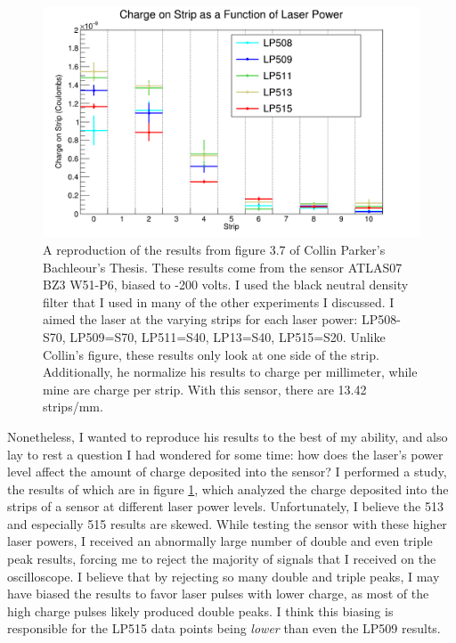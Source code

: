 \documentclass{report}
\begin{document}
            \begin{figure}[h] 
                \includegraphics[height=.4\textheight]{charge_collection}
                \centering
                \caption{ A reproduction of the results from figure 3.7 of Collin Parker's Bachleour's Thesis. These results come from the sensor ATLAS07 BZ3 W51-P6, biased to -200 volts. I used the black neutral density filter that I used in many of the other experiments I discussed. I aimed the laser at the varying strips for each laser power: LP508-S70, LP509=S70, LP511=S40, LP13=S40, LP515=S20. Unlike Collin's figure, these results only look at one side of the strip. Additionally, he normalize his results to charge per millimeter, while mine are charge per strip. With this sensor, there are 13.42 strips/mm.}
                \label{fig:charge_collection}
            \end{figure}

            Nonetheless, I wanted to reproduce his results to the best of my ability, and also lay to rest a question I had wondered for some time: how does the laser's power level affect the amount of charge deposited into the sensor? I performed a study, the results of which are in figure \ref{fig:charge_collection}, which analyzed the charge deposited into the strips of a sensor at different laser power levels. Unfortunately, I believe the 513 and especially 515 results are skewed. While testing the sensor with these higher laser powers, I received an abnormally large number of double and even triple peak results, forcing me to reject the majority of signals that I received on the oscilloscope. I believe that by rejecting so many double and triple peaks, I may have biased the results to favor laser pulses with lower charge, as most of the high charge pulses likely produced double peaks. I think this biasing is responsible for the LP515 data points being \textit{lower} than even the LP509 results.
\end{document}
